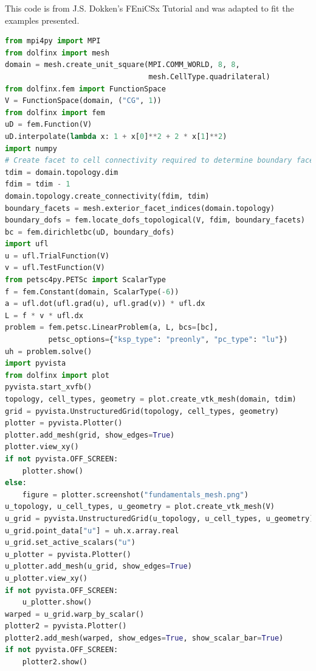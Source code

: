\begin{appendices}
This code is from J.S. Dokken's FEniCSx Tutorial \cite{fenics-tutorial} and was adapted to fit the examples presented.

\begin{lstlisting}[language=Python, caption={Solving the Poisson Equation}]
from mpi4py import MPI
from dolfinx import mesh
domain = mesh.create_unit_square(MPI.COMM_WORLD, 8, 8,
                                 mesh.CellType.quadrilateral)
from dolfinx.fem import FunctionSpace
V = FunctionSpace(domain, ("CG", 1))
from dolfinx import fem
uD = fem.Function(V)
uD.interpolate(lambda x: 1 + x[0]**2 + 2 * x[1]**2)
import numpy
# Create facet to cell connectivity required to determine boundary facets
tdim = domain.topology.dim
fdim = tdim - 1
domain.topology.create_connectivity(fdim, tdim)
boundary_facets = mesh.exterior_facet_indices(domain.topology)
boundary_dofs = fem.locate_dofs_topological(V, fdim, boundary_facets)
bc = fem.dirichletbc(uD, boundary_dofs)
import ufl
u = ufl.TrialFunction(V)
v = ufl.TestFunction(V)
from petsc4py.PETSc import ScalarType
f = fem.Constant(domain, ScalarType(-6))
a = ufl.dot(ufl.grad(u), ufl.grad(v)) * ufl.dx
L = f * v * ufl.dx
problem = fem.petsc.LinearProblem(a, L, bcs=[bc], 
          petsc_options={"ksp_type": "preonly", "pc_type": "lu"})
uh = problem.solve()
import pyvista
from dolfinx import plot
pyvista.start_xvfb()
topology, cell_types, geometry = plot.create_vtk_mesh(domain, tdim)
grid = pyvista.UnstructuredGrid(topology, cell_types, geometry)
plotter = pyvista.Plotter()
plotter.add_mesh(grid, show_edges=True)
plotter.view_xy()
if not pyvista.OFF_SCREEN:
    plotter.show()
else:
    figure = plotter.screenshot("fundamentals_mesh.png")
u_topology, u_cell_types, u_geometry = plot.create_vtk_mesh(V)
u_grid = pyvista.UnstructuredGrid(u_topology, u_cell_types, u_geometry)
u_grid.point_data["u"] = uh.x.array.real
u_grid.set_active_scalars("u")
u_plotter = pyvista.Plotter()
u_plotter.add_mesh(u_grid, show_edges=True)
u_plotter.view_xy()
if not pyvista.OFF_SCREEN:
    u_plotter.show()
warped = u_grid.warp_by_scalar()
plotter2 = pyvista.Plotter()
plotter2.add_mesh(warped, show_edges=True, show_scalar_bar=True)
if not pyvista.OFF_SCREEN:
    plotter2.show()
\end{lstlisting}


\end{appendices}
